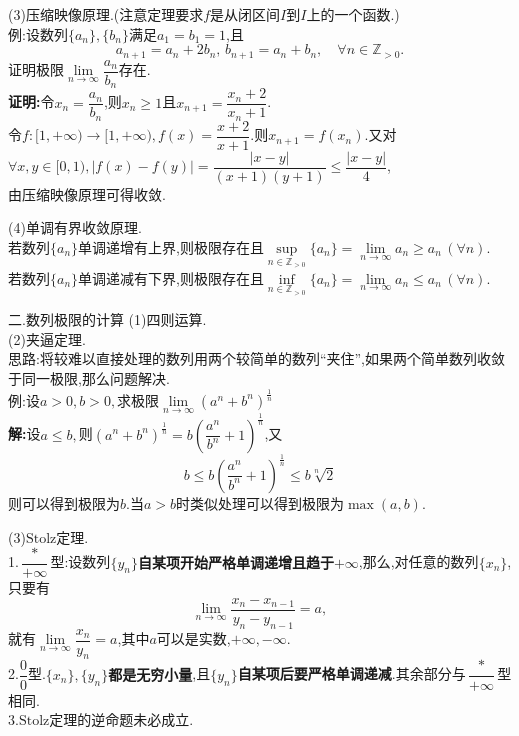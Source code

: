 \documentclass[UTF8]{ctexbeamer}
\begin{document}
    \begin{frame}
        (3)压缩映像原理.(注意定理要求$f$是从闭区间$I$到$I$上的一个函数.)
        \\例:设数列$\{a_n\},\{b_n\}$满足$a_1=b_1=1$,且
        $$a_{n+1}=a_n+2b_n,\,b_{n+1}=a_n+b_n,\quad \forall n\in\mathbb{Z}_{>0}.$$
        证明极限$\lim\limits_{n\to\infty}\dfrac{a_n}{b_n}$存在.
        \pause
        \\\textbf{证明:}令$x_n=\dfrac{a_n}{b_n}$,则$x_n\geqslant 1$且$x_{n+1}=\dfrac{x_n+2}{x_n+1}$.
        \\令$f:[1,+\infty)\longrightarrow [1,+\infty),f(x)=\dfrac{x+2}{x+1}$.则$x_{n+1}=f(x_n)$.又对$\forall x,y\in[0,1),|f(x)-f(y)|=\dfrac{\left|x-y\right|}{(x+1)(y+1)}\leqslant\dfrac{|x-y|}{4}$,
        \\由压缩映像原理可得收敛.
    \end{frame}
    \begin{frame}
        (4)单调有界收敛原理.
        \\若数列$\{a_n\}$单调递增有上界,则极限存在且$\sup\limits_{n\in\mathbb{Z}_{>0}}\{a_n\}=\lim\limits_{n\to\infty}a_n\geqslant a_n\,(\forall n)$.
        \\若数列$\{a_n\}$单调递减有下界,则极限存在且$\inf\limits_{n\in\mathbb{Z}_{>0}}\{a_n\}=\lim\limits_{n\to\infty}a_n\leqslant a_n\,(\forall n)$.
    \end{frame}
    \begin{frame}{二.数列极限的计算}
        (1)四则运算.
        \\(2)夹逼定理.
        \\思路:将较难以直接处理的数列用两个较简单的数列“夹住”,如果两个简单数列收敛于同一极限,那么问题解决.
        \\例:设$a>0,b>0,$求极限$\lim\limits_{n\to\infty}(a^n+b^n)^{\frac{1}{n}}$
        \pause
        \\\textbf{解:}设$a\leqslant b,$则$(a^n+b^n)^{\frac{1}{n}}=b\left(\dfrac{a^n}{b^n}+1\right)^\frac{1}{n}$,又$$b\leqslant b\left(\dfrac{a^n}{b^n}+1\right)^\frac{1}{n}\leqslant b\sqrt[n]{2}$$
        则可以得到极限为$b$.当$a>b$时类似处理可以得到极限为$\max(a,b)$.
    \end{frame}
    \begin{frame}
        (3)$\mathrm{Stolz}$定理.
        \\1.$\dfrac{\ast}{+\infty}$型:设数列$\{y_n\}$\textbf{自某项开始严格单调递增且趋于$+\infty$},那么,对任意的数列$\{x_n\}$,只要有
        $$\lim_{n\to\infty}\frac{x_n-x_{n-1}}{y_n-y_{n-1}}=a,$$
        就有$\lim\limits_{n\to\infty}\dfrac{x_n}{y_n}=a$,其中$a$可以是实数,$+\infty,-\infty$.
        \\2.$\dfrac{0}{0}$型.\textbf{$\{x_n\},\{y_n\}$都是无穷小量},且$\{y_n\}$\textbf{自某项后要严格单调递减}.其余部分与$\dfrac{\ast}{+\infty}$型相同.
        \\3.$\mathrm{Stolz}$定理的逆命题未必成立.
    \end{frame}
\end{document}
